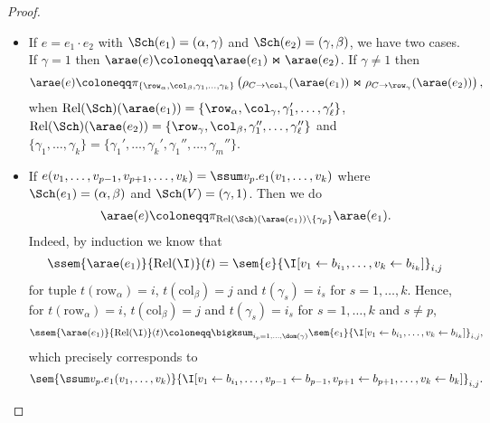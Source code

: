 \begin{proof}
\begin{itemize}
  \item If $e=e_1\cdot e_2$ with $\Sch (e_1)=(\alpha, \gamma)$ and $\Sch (e_2)=(\gamma, \beta)$, we have two cases. If $\gamma = 1$ then $\arae (e)\coloneqq \arae (e_1)\Join \arae (e_2)$.
If $\gamma\neq 1$ then
$$
\arae (e) \coloneqq  \pi_{\lbrace \row_{\alpha},\col_{\beta}, \gamma_1,\ldots,\gamma_k \rbrace}\left(\rho_{C\to \col_\gamma}(\arae (e_1))\Join \rho_{C\to \row_\gamma}(\arae (e_2)) \right),
$$
when $\text{Rel}(\Sch)(\arae(e_1))=\{\row_\alpha,\col_\gamma,\gamma_1',\ldots,\gamma_{\ell}'\}$,
$\text{Rel}(\Sch)(\arae(e_2))=\{\row_\gamma,\col_\beta,\gamma_1'',\ldots,\gamma_{\ell}''\}$ and $\{\gamma_1,\ldots,\gamma_k\}=\{\gamma_1',\ldots,\gamma_k',\gamma_1'',\ldots,\gamma_m''\}$.


  \item If $e(v_1,\ldots,v_{p-1},v_{p+1},\ldots,v_k)=\ssum v_p. e_1(v_1,\ldots,v_k)$ where $\Sch(e_1)=(\alpha,\beta)$ and $\Sch(V)=(\gamma,1)$. Then we do 
  $$
  \arae (e)\coloneqq \pi_{\text{Rel}(\Sch)(\arae(e_1))\setminus\{\gamma_p\}} \arae (e_1).
  $$
 Indeed, by induction we know that 
 $$
\ssem{\arae(e_1)}{\text{Rel}(\I)}(t)=\sem{e}{\I[v_1\gets b_{i_1},\ldots,v_k\gets b_{i_k}]}_{i,j}
$$
for tuple $t(\mathrm{row}_\alpha)=i$, $t(\mathrm{col}_\beta)=j$ and $t(\gamma_s)=i_s$ for $s=1,\ldots, k$.
Hence, for $t(\mathrm{row}_\alpha)=i$, $t(\mathrm{col}_\beta)=j$ and $t(\gamma_s)=i_s$ for $s=1,\ldots, k$ and $s\neq p$,
$$
\ssem{\arae(e_1)}{\text{Rel}(\I)}(t)\coloneqq \bigksum_{i_p=1,\ldots,\dom(\gamma)} \sem{e_1}{\I[v_1\gets b_{i_1},\ldots,v_k\gets b_{i_k}]}_{i,j},$$
which precisely corresponds to 
$$
\sem{\ssum v_p. e_1(v_1,\ldots,v_k)}{\I[v_1\gets b_{i_1},\ldots,v_{p-1}\gets b_{p-1},v_{p+1}\gets b_{p+1},\ldots,v_k\gets b_k]}_{i,j}.
$$
 

\end{itemize}
\end{proof}

